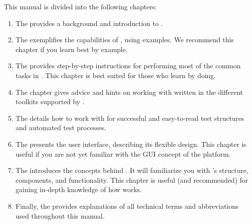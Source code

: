 This manual is divided into the following chapters:

\begin{enumerate}
\item The  provides a background and introduction to \app{}.

\item The   exemplifies the capabilities of \app{}, using 
\app{} \gdproject{} examples.
We recommend this chapter if you learn best by example. 

\item The  provides step-by-step instructions for performing most of the common tasks in \app{}.
This chapter is best suited for those who learn by doing.

\item The  chapter  gives advice and hints on working with \gdauts{} written in the different toolkits supported by \app{}.

\item The  details how to work with \app{} for successful and easy-to-read test structures and automated test processes.

\item The  presents the \app{} user interface, describing its flexible design.
This chapter is useful if you are not yet familiar  with the GUI concept of the  platform.

\item The  introduces the concepts behind
  \app{}. It will familiarize you with \app{}'s structure, components, and functionality. This chapter is useful (and recommended) for gaining in-depth knowledge of how \app{} works.


\item Finally, the  provides explanations of all
technical terms and abbreviations used throughout this manual.
\end{enumerate}
